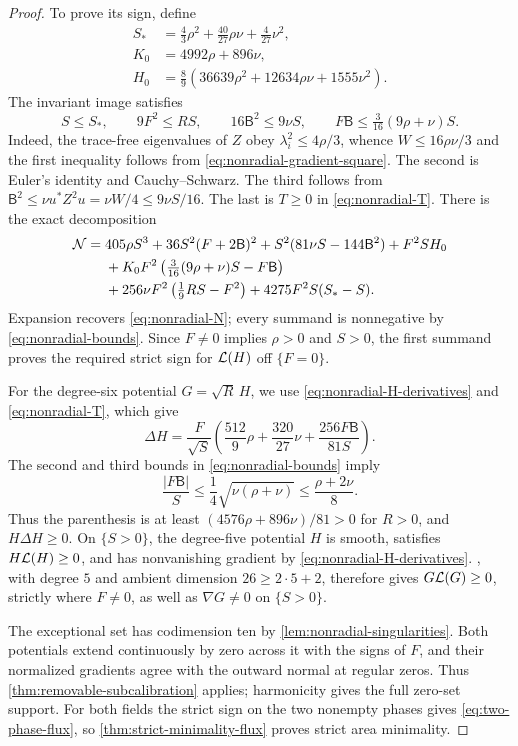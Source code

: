 \begin{proof}
To prove its sign, define
\[
\begin{aligned}
 S_* &=\tfrac43\rho^2+\tfrac{40}{27}\rho\nu+\tfrac4{27}\nu^2,\\
 K_0&=4992\rho+896\nu,\\
 H_0&=\tfrac89(36639\rho^2+12634\rho\nu+1555\nu^2).
\end{aligned}
\]
The invariant image satisfies
\begin{equation}\label{eq:nonradial-bounds}
 S\le S_*,\qquad 9F^2\le RS,\qquad
 16\mathsf{B}^2\le9\nu S,\qquad
 F\mathsf{B}\le\tfrac3{16}(9\rho+\nu)S.
\end{equation}
Indeed, the trace-free eigenvalues of \(Z\) obey
\(\lambda_i^2\le4\rho/3\), whence
\(W\le16\rho\nu/3\) and the first inequality follows from
\eqref{eq:nonradial-gradient-square}. The second is Euler's
identity and Cauchy--Schwarz. The third follows from
\(\mathsf{B}^2\le\nu u^*Z^2u=\nu W/4\le9\nu S/16\).
The last is \(T\ge0\) in \eqref{eq:nonradial-T}.
There is the exact decomposition
\begin{align}\label{eq:nonradial-positive-certificate}
 \mathcal N={}&405\rho S^3+36S^2(F+2\mathsf{B})^2
                      +S^2(81\nu S-144\mathsf{B}^2)+F^2SH_0\notag\\
 &+K_0F^2\left(\tfrac3{16}(9\rho+\nu)S-F\mathsf{B}\right)\notag\\
 &+256\nu F^2\left(\tfrac19RS-F^2\right)
                      +4275F^2S(S_*-S).
\end{align}
Expansion recovers \eqref{eq:nonradial-N}; every summand is
nonnegative by \eqref{eq:nonradial-bounds}. Since $F\ne0$ implies
$\rho>0$ and $S>0$, the first summand proves the required strict
sign for \(\mathcal L(H)\) off \(\{F=0\}\).

For the degree-six potential \(G=\sqrt R\,H\), we use
\eqref{eq:nonradial-H-derivatives} and
\eqref{eq:nonradial-T}, which give
\[
 \Delta H=\frac F{\sqrt S}
 \left(\frac{512}{9}\rho+\frac{320}{27}\nu
                         +\frac{256F\mathsf{B}}{81S}\right).
\]
The second and third bounds in \eqref{eq:nonradial-bounds} imply
\[
 \frac{|F\mathsf{B}|}{S}\le\frac14\sqrt{\nu(\rho+\nu)}
                   \le\frac{\rho+2\nu}{8}.
\]
Thus the parenthesis is at least
\((4576\rho+896\nu)/81>0\) for \(R>0\), and
\(H\Delta H\ge0\). On \(\{S>0\}\), the degree-five
potential \(H\) is smooth, satisfies \(H\mathcal L(H)\ge0\), and
has nonvanishing gradient by \eqref{eq:nonradial-H-derivatives}.
, with degree \(5\) and ambient
dimension \(26\ge2\cdot5+2\), therefore gives
\(G\mathcal L(G)\ge0\), strictly where \(F\ne0\), as well as
\(\nabla G\ne0\) on \(\{S>0\}\).

The exceptional set has codimension ten by
\cref{lem:nonradial-singularities}. Both potentials extend continuously
by zero across it with the signs of \(F\), and their normalized gradients
agree with the outward normal at regular zeros. Thus
\cref{thm:removable-subcalibration} applies; harmonicity gives the full
zero-set support. For both fields the strict sign on the two nonempty
phases gives \eqref{eq:two-phase-flux}, so
\cref{thm:strict-minimality-flux} proves strict area minimality.
\end{proof}

